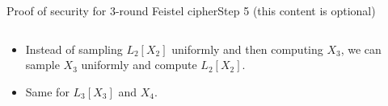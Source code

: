 \documentclass[aspectratio=169, lualatex, handout]{beamer}
\begin{document}
	\begin{frame}{Proof of security for 3-round Feistel cipher}{Step 5 (this content is optional)}
		\begin{columns}[c]
			\begin{column}{0.5\textwidth}
				\begin{itemize}
					\item Instead of sampling $L_2[X_2]$ uniformly and then computing $X_3$, we can sample $X_3$ uniformly and compute $L_2[X_2]$.
					\item Same for $L_3[X_3]$ and $X_4$.
				\end{itemize}
			\end{column}
			\begin{column}{0.5\textwidth}
				\vspace{-1.5cm}
				\begin{center}
				\end{center}
			\end{column}
		\end{columns}
	\end{frame}
\end{document}
